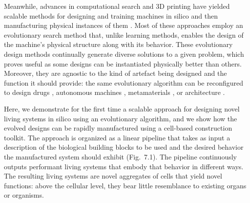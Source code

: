 Meanwhile, advances in computational search and 3D printing have yielded scalable methods for designing and training machines in silico \cite{sims1994alife,cheney2018scalable} and then manufacturing physical instances of them \cite{lipson2000automatic,bongard2006resilient,cellucci20171d}. 
Most of these approaches employ an evolutionary search method \cite{munk2015topology} that, unlike learning methods, enables the design of the machine's physical structure along with its behavior. 
These evolutionary design methods continually generate diverse solutions to a given problem, which proves useful as some designs can be instantiated physically better than others. 
Moreover, they are agnostic to the kind of artefact being designed and the function it should provide: the same evolutionary algorithm can be reconfigured to design drugs \cite{devi2015evolutionary}, autonomous machines \cite{lipson2000automatic,cellucci20171d}, metamaterials \cite{huntington2014subwavelength}, or architecture \cite{mueller2015combining}. 

Here, we demonstrate for the first time a scalable approach for designing novel living systems in silico using an evolutionary algorithm, and we show how the evolved designs can be rapidly manufactured using a cell-based construction toolkit. 
The approach is organized as a linear pipeline that takes as input a description of the biological building blocks to be used and the desired behavior the manufactured system should exhibit (Fig.~7.1). 
The pipeline continuously outputs performant living systems that embody that behavior in different ways. The resulting living systems are novel aggregates of cells that yield novel functions: above the cellular level, they bear little resemblance to existing organs or organisms.


